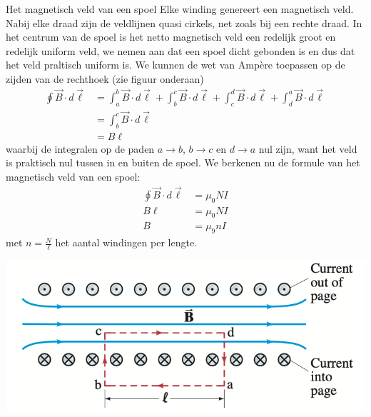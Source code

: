 \begin{theo}{Het magnetisch veld van een spoel}
    \noindent Elke winding genereert een magnetisch veld. Nabij elke draad zijn de veldlijnen quasi cirkels,
    net zoals bij een rechte draad. In het centrum van de spoel is het netto magnetisch veld een redelijk
    groot en redelijk uniform veld, we nemen aan dat een spoel dicht gebonden is en dus dat het veld praltisch uniform is.
    We kunnen de wet van Ampère toepassen op de zijden van de rechthoek (zie figuur onderaan)
    \begin{align*}
        \oint \Vec{B} \cdot d\Vec{\ell} &= \int_{a}^{b} \Vec{B} \cdot d\Vec{\ell} + \int_{b}^{c} \Vec{B} \cdot d\Vec{\ell}
        +  \int_{c}^{d} \Vec{B} \cdot d\Vec{\ell} +  \int_{d}^{a} \Vec{B} \cdot d\Vec{\ell} \\
                                        &= \int_{b}^{c} \Vec{B} \cdot d\Vec{\ell}  \\
                                        &= B\ell
    \end{align*}
    waarbij de integralen op de paden $a \to b$, $b \to c$ en $d \to a$ nul zijn, want het veld is praktisch nul tussen in en buiten de spoel.
    We berkenen nu de formule van het magnetisch veld van een spoel:
    \begin{align*}
        \oint \Vec{B} \cdot d\Vec{\ell} &= \mu_{0}NI \\
        B\ell &=  \mu_{0}NI \\
        B &=  \mu_{9}nI
    \end{align*}
    met $n= \tfrac{N}{\ell}$ het aantal windingen per lengte.
    \begin{center}
        \includegraphics[scale = 0.3]{Images/Magnetisme/SpoelMagnetischVeld}
    \end{center}
\end{theo}